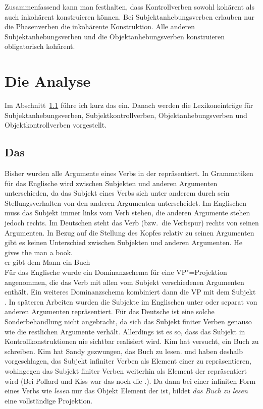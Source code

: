 \noindent
Zusammenfassend kann man festhalten, dass Kontrollverben sowohl kohärent als auch inkohärent
konstruieren können. Bei Subjektanhebungsverben erlauben nur die Phasenverben die inkohärente
Konstruktion. Alle anderen Subjektanhebungsverben und die Objektanhebungsverben konstruieren obligatorisch
kohärent.


\section{Die Analyse}
\label{sec-anhebung-anal}

Im Abschnitt~\ref{sec-subj-merkmal} führe ich kurz das \subjm ein. Danach werden die Lexikoneinträge
für Subjektanhebungsverben, Subjektkontrollverben, Objektanhebungsverben und Objektkontrollverben
vorgestellt.

\subsection{Das \subjm}
\label{sec-subj-merkmal}

Bisher wurden alle Argumente eines Verbs in der \compsl repräsentiert.
In Grammatiken für das Englische wird zwischen Subjekten und anderen Argumenten
unterschieden, da das Subjekt eines Verbs sich unter anderem durch sein
Stellungsverhalten von den anderen Argumenten unterscheidet. Im Englischen
muss das Subjekt immer links vom Verb stehen, die anderen Argumente stehen
jedoch rechts. Im Deutschen steht das Verb (bzw.\ die Verbspur) rechts von seinen
Argumenten. In Bezug auf die Stellung des Kopfes relativ zu seinen Argumenten
gibt es keinen Unterschied zwischen Subjekten und anderen Argumenten.
\ea
\gll He gives the man a book.\\
     er gibt dem Mann ein Buch\\
\z
Für das Englische wurde ein Dominanzschema für eine VP"=Projektion
angenommen, die das Verb mit allen vom Subjekt verschiedenen Argumenten enthält.
Ein weiteres Dominanzschema kombiniert dann die VP mit dem Subjekt \citep[38--39]{ps2}. In späteren
Arbeiten wurden die Subjekte im Englischen unter \subj \parencites[334--336]{Borsley89b}[Kapitel~9]{ps2} oder \spr \citep*[Abschnitt~4.3]{SWB2003a} separat von anderen Argumenten repräsentiert.
Für das Deutsche
ist eine solche Sonderbehandlung nicht angebracht, da sich das Subjekt finiter Verben
genauso wie die restlichen Argumente verhält. Allerdings ist es so, dass das Subjekt
in Kontrollkonstruktionen nie sichtbar realisiert wird.
\eal
\ex Kim hat versucht, ein Buch zu schreiben.
\ex Kim hat Sandy gezwungen, das Buch zu lesen.
\zl
\citet[295]{Pollard90a} und \textcites[268]{Kiss92}[Abschnitt~3.1.1, Abschnitt~3.2.4]{Kiss95a} haben deshalb vorgeschlagen, das Subjekt infiniter
Verben als Element einer \subjl zu repräsentieren, wohingegen das Subjekt
finiter Verben weiterhin als Element der \compsl repräsentiert wird (Bei Pollard und Kiss war das
noch die \subcatl.). Da dann
bei einer infiniten Form eines Verbs wie \emph{lesen} nur das Objekt Element
der \compsl ist, bildet \emph{das Buch zu lesen} eine vollständige Projektion.

